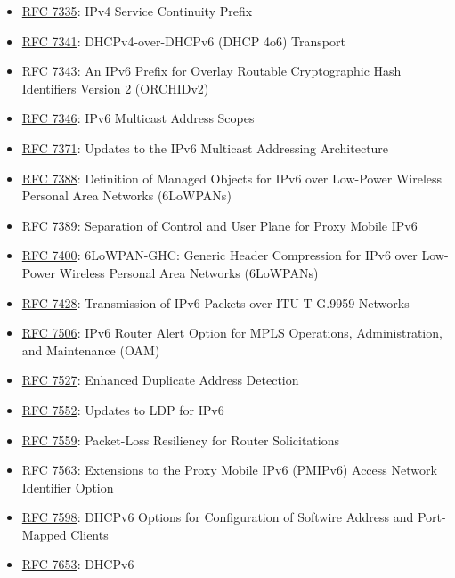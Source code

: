 \documentclass[
]{article}
\begin{document}
\begin{itemize}
\item
  \href{https://www.rfc-editor.org/info/rfc7335}{RFC 7335}: IPv4 Service
  Continuity Prefix
\item
  \href{https://www.rfc-editor.org/info/rfc7341}{RFC 7341}:
  DHCPv4-over-DHCPv6 (DHCP 4o6) Transport
\item
  \href{https://www.rfc-editor.org/info/rfc7343}{RFC 7343}: An IPv6
  Prefix for Overlay Routable Cryptographic Hash Identifiers Version 2
  (ORCHIDv2)
\item
  \href{https://www.rfc-editor.org/info/rfc7346}{RFC 7346}: IPv6
  Multicast Address Scopes
\item
  \href{https://www.rfc-editor.org/info/rfc7371}{RFC 7371}: Updates to
  the IPv6 Multicast Addressing Architecture
\item
  \href{https://www.rfc-editor.org/info/rfc7388}{RFC 7388}: Definition
  of Managed Objects for IPv6 over Low-Power Wireless Personal Area
  Networks (6LoWPANs)
\item
  \href{https://www.rfc-editor.org/info/rfc7389}{RFC 7389}: Separation
  of Control and User Plane for Proxy Mobile IPv6
\item
  \href{https://www.rfc-editor.org/info/rfc7400}{RFC 7400}: 6LoWPAN-GHC:
  Generic Header Compression for IPv6 over Low-Power Wireless Personal
  Area Networks (6LoWPANs)
\item
  \href{https://www.rfc-editor.org/info/rfc7428}{RFC 7428}: Transmission
  of IPv6 Packets over ITU-T G.9959 Networks
\item
  \href{https://www.rfc-editor.org/info/rfc7506}{RFC 7506}: IPv6 Router
  Alert Option for MPLS Operations, Administration, and Maintenance
  (OAM)
\item
  \href{https://www.rfc-editor.org/info/rfc7527}{RFC 7527}: Enhanced
  Duplicate Address Detection
\item
  \href{https://www.rfc-editor.org/info/rfc7552}{RFC 7552}: Updates to
  LDP for IPv6
\item
  \href{https://www.rfc-editor.org/info/rfc7559}{RFC 7559}: Packet-Loss
  Resiliency for Router Solicitations
\item
  \href{https://www.rfc-editor.org/info/rfc7563}{RFC 7563}: Extensions
  to the Proxy Mobile IPv6 (PMIPv6) Access Network Identifier Option
\item
  \href{https://www.rfc-editor.org/info/rfc7598}{RFC 7598}: DHCPv6
  Options for Configuration of Softwire Address and Port-Mapped Clients
\item
  \href{https://www.rfc-editor.org/info/rfc7653}{RFC 7653}: DHCPv6

\end{itemize}
\end{document}
